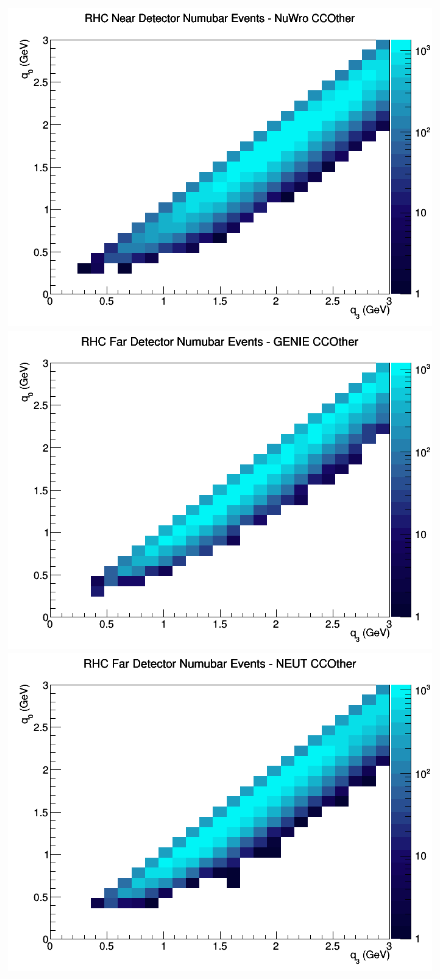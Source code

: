 \documentclass[12pt]{article}
\begin{document}
\begin{figure}[h]
\includegraphics[width=\linewidth]{q0_q3/nominal/CCOther_RHC_ND_numubar_q3_q0_NuWro.png}
\endminipage
\newline
{}
\includegraphics[width=\linewidth]{q0_q3/nominal/CCOther_RHC_FD_numubar_q3_q0_GENIE.png}
\endminipage
{}
\includegraphics[width=\linewidth]{q0_q3/nominal/CCOther_RHC_FD_numubar_q3_q0_NEUT.png}

\end{figure}
\end{document}
